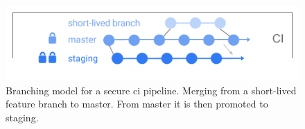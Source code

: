 \documentclass[../main.tex]{subfiles}
\begin{document}
    \begin{figure}[h]
        \centering
        \includegraphics[width=.9\linewidth]{img/out_git_branching_ci_v3.png}
        \captionsetup{justification=centering}
        \caption{
            Branching model for a secure \acrlong{ci} pipeline.
            Merging from a short-lived feature branch to master.
            From master it is then promoted to staging.
        }
        \label{fig:git_branching_master}
    \end{figure}
\end{document}
